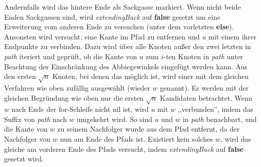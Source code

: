 \documentclass[a4paper, 10pt, ngerman]{article}
\begin{document}
Andernfalls wird das hintere Ende als Sackgasse markiert. Wenn nicht beide Enden Sackgassen sind, wird \emph{extendingBack} auf \textbf{false} gesetzt um eine Erweiterung vom anderen Ende zu versuchen (unter dem vorletzten \textbf{else}). Ansonsten wird versucht, eine Kante im Pfad zu entfernen und $u$ mit einem ihrer Endpunkte zu verbinden. Dazu wird über alle Knoten außer den zwei letzten in \emph{path} iteriert und geprüft, ob die Kante von $u$ zum $i$-ten Knoten in \emph{path} unter Beachtung der Einschränkung des Abbiegewinkels eingefügt werden kann. Aus den ersten $\sqrt n$ Knoten, bei denen das möglich ist, wird einer mit dem gleichen Verfahren wie oben zufällig ausgewählt (wieder $w$ genannt). Es werden mit der gleichen Begründung wie oben nur die ersten $\sqrt n$ Kandidaten betrachtet. Wenn $w$ nach Ende der for-Schleife nicht nil ist, wird $u$ mit $w$ ,,verbunden'', indem das Suffix von \emph{path} nach $w$ umgekehrt wird. So sind $u$ und $w$ in \emph{path} benachbart, und die Kante von $w$ zu seinem Nachfolger wurde aus dem Pfad entfernt, da der Nachfolger von $w$ nun am Ende des Pfads ist. Existiert kein solches $w$, wird das gleiche am vorderen Ende des Pfads versucht, indem \emph{extendingBack} auf \textbf{false} gesetzt wird.
\end{document}
